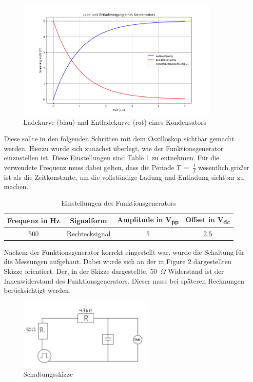 \documentclass[a4paper,12pt]{article}
\begin{document}
\begin{figure}[H]
    \centering
    \includegraphics[width=0.9\textwidth]{../Quellen/Labor2/Lade-EntladefunktionSkizze.png}
\caption{Ladekurve (blau) und Entladekurve (rot) eines Kondensators}
\end{figure}

\noindent Diese sollte in den folgenden Schritten mit dem Oszilloskop sichtbar gemacht werden. Hierzu wurde sich zunächst überlegt, wie der Funktionsgenerator einzustellen ist. Diese Einstellungen sind Table 1 zu entnehmen. Für die verwendete Frequenz muss dabei gelten, dass die Periode \(T~=~\frac{1}{f}\) wesentlich größer ist als die Zeitkonstante, um die vollständige Ladung und Entladung sichtbar zu machen.

\begin{table}[H]
	\centering
	\begin{tabular}{|c|c|c|c|}
		\hline
		\textbf{Frequenz in Hz} & \textbf{Signalform} & \textbf{Amplitude in V\textsubscript{pp}} & \textbf{Offset in V\textsubscript{dc}}\\
		\hline
		500 & Rechtecksignal & 5 & 2.5\\
		\hline
	\end{tabular}
	\caption{Einstellungen des Funktionsgenerators}
\end{table}

\noindent Nachem der Funktionsgenerator korrekt eingestellt war, wurde die Schaltung  für die Messungen aufgebaut. Dabei wurde sich an der in Figure 2 dargestellten Skizze orientiert. Der, in der Skizze dargestellte, 50~$\Omega$ Widerstand ist der Innenwiderstand des Funktionsgenerators. Dieser muss bei späteren Rechnungen berücksichtigt werden.\\

\begin{figure}[H]
    \centering
    \includegraphics[width=0.6\textwidth]{../Quellen/Labor2/SchaltungsaufbauVersuch1.jpeg}
\caption{Schaltungsskizze}
\end{figure}
\end{document}
